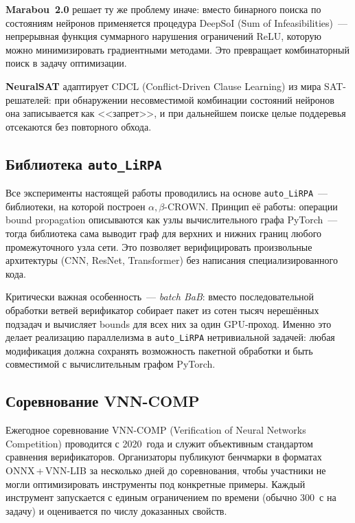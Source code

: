 \textbf{Marabou~2.0} решает ту же проблему иначе: вместо бинарного
поиска по состояниям нейронов применяется процедура DeepSoI
(Sum of Infeasibilities)~--- непрерывная функция суммарного нарушения
ограничений ReLU, которую можно минимизировать градиентными методами.
Это превращает комбинаторный поиск в задачу оптимизации.\cite{arXiv2401Marabou2}

\textbf{NeuralSAT} адаптирует CDCL (Conflict-Driven Clause Learning)
из мира SAT-решателей: при обнаружении несовместимой комбинации
состояний нейронов она записывается как <<запрет>>, и при дальнейшем
поиске целые поддеревья отсекаются без повторного обхода.\cite{NeuralSATRepo}

\subsection{Библиотека \texorpdfstring{\texttt{auto\_LiRPA}}{auto\_LiRPA}}
\label{sec:auto_lirpa}

Все эксперименты настоящей работы проводились на основе
\texttt{auto\_LiRPA}\cite{AlphaBetaCrownVNNCOMP23}~---
библиотеки, на которой построен $\alpha,\beta$-CROWN.
Принцип её работы: операции bound propagation описываются как узлы
вычислительного графа PyTorch~--- тогда библиотека сама выводит граф
для верхних и нижних границ любого промежуточного узла сети.
Это позволяет верифицировать произвольные архитектуры
(CNN, ResNet, Transformer) без написания специализированного
кода.\cite{LiRPAVerifyRepo}

Критически важная особенность~--- \textit{batch BaB}: вместо
последовательной обработки ветвей верификатор собирает пакет из сотен
тысяч нерешённых подзадач и вычисляет bounds для всех них за один
GPU-проход.
Именно это делает реализацию параллелизма в \texttt{auto\_LiRPA}
нетривиальной задачей: любая модификация должна сохранять возможность
пакетной обработки и быть совместимой с вычислительным графом PyTorch.

\subsection{Соревнование VNN-COMP}
\label{sec:vnncomp}

Ежегодное соревнование VNN-COMP (Verification of Neural Networks
Competition)\cite{arXiv2212VNNCOMP2022} проводится с 2020~года
и служит объективным стандартом сравнения верификаторов.
Организаторы публикуют бенчмарки в форматах ONNX\,+\,VNN-LIB
за несколько дней до соревнования, чтобы участники не могли
оптимизировать инструменты под конкретные примеры.
Каждый инструмент запускается с единым ограничением по времени
(обычно 300~с на задачу) и оценивается по числу доказанных свойств.

